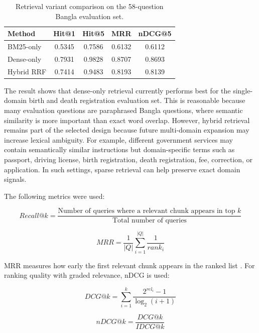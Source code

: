 \begin{table}[h]
\centering
\caption{Retrieval variant comparison on the 58-question Bangla evaluation set.}
\label{tab:retrieval_comparison}
\begin{tabular}{|l|c|c|c|c|}
\hline
\textbf{Method} & \textbf{Hit@1} & \textbf{Hit@5} & \textbf{MRR} & \textbf{nDCG@5} \\
\hline
BM25-only & 0.5345 & 0.7586 & 0.6132 & 0.6112 \\
\hline
Dense-only & 0.7931 & 0.9828 & 0.8707 & 0.8693 \\
\hline
Hybrid RRF & 0.7414 & 0.9483 & 0.8193 & 0.8139 \\
\hline
\end{tabular}
\end{table}

The result shows that dense-only retrieval currently performs best for the single-domain birth and death registration evaluation set. This is reasonable because many evaluation questions are paraphrased Bangla questions, where semantic similarity is more important than exact word overlap. However, hybrid retrieval remains part of the selected design because future multi-domain expansion may increase lexical ambiguity. For example, different government services may contain semantically similar instructions but domain-specific terms such as passport, driving license, birth registration, death registration, fee, correction, or application. In such settings, sparse retrieval can help preserve exact domain signals.

The following metrics were used:

\begin{equation}
Recall@k = \frac{\text{Number of queries where a relevant chunk appears in top }k}{\text{Total number of queries}}
\end{equation}

\begin{equation}
MRR = \frac{1}{|Q|}\sum_{i=1}^{|Q|}\frac{1}{rank_i}
\end{equation}

MRR measures how early the first relevant chunk appears in the ranked list \cite{voorhees1999trec8qa,manning2008ir}. For ranking quality with graded relevance, nDCG is used:

\begin{equation}
DCG@k = \sum_{i=1}^{k}\frac{2^{rel_i}-1}{\log_2(i+1)}
\end{equation}

\begin{equation}
nDCG@k = \frac{DCG@k}{IDCG@k}
\end{equation}

